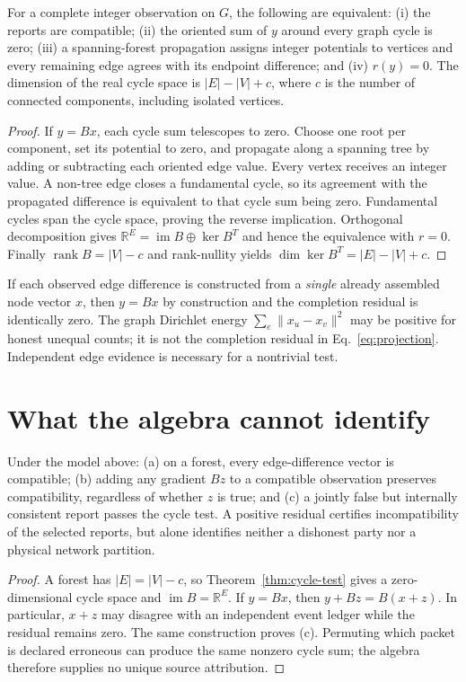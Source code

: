 \documentclass[11pt,a4paper]{article}
\begin{document}
\begin{theorem}\label{thm:cycle-test}
For a complete integer observation on $G$, the following are equivalent: (i) the reports are compatible; (ii) the oriented sum of $y$ around every graph cycle is zero; (iii) a spanning-forest propagation assigns integer potentials to vertices and every remaining edge agrees with its endpoint difference; and (iv) $r(y)=0$. The dimension of the real cycle space is $|E|-|V|+c$, where $c$ is the number of connected components, including isolated vertices.
\end{theorem}
\begin{proof}
If $y=Bx$, each cycle sum telescopes to zero. Choose one root per component, set its potential to zero, and propagate along a spanning tree by adding or subtracting each oriented edge value. Every vertex receives an integer value. A non-tree edge closes a fundamental cycle, so its agreement with the propagated difference is equivalent to that cycle sum being zero. Fundamental cycles span the cycle space, proving the reverse implication. Orthogonal decomposition gives $\mathbb R^E=\operatorname{im}B\oplus\ker B^T$ and hence the equivalence with $r=0$. Finally $\operatorname{rank}B=|V|-c$ and rank-nullity yields $\dim\ker B^T=|E|-|V|+c$.
\end{proof}

If each observed edge difference is constructed from a \emph{single} already assembled node vector $x$, then $y=Bx$ by construction and the completion residual is identically zero. The graph Dirichlet energy $\sum_e\|x_u-x_v\|^2$ may be positive for honest unequal counts; it is not the completion residual in Eq.~\ref{eq:projection}. Independent edge evidence is necessary for a nontrivial test.

\section{What the algebra cannot identify}\label{sec:limits}
\begin{theorem}\label{thm:compatibility-limits}
Under the model above: (a) on a forest, every edge-difference vector is compatible; (b) adding any gradient $Bz$ to a compatible observation preserves compatibility, regardless of whether $z$ is true; and (c) a jointly false but internally consistent report passes the cycle test. A positive residual certifies incompatibility of the selected reports, but alone identifies neither a dishonest party nor a physical network partition.
\end{theorem}
\begin{proof}
A forest has $|E|=|V|-c$, so Theorem~\ref{thm:cycle-test} gives a zero-dimensional cycle space and $\operatorname{im}B=\mathbb R^E$. If $y=Bx$, then $y+Bz=B(x+z)$. In particular, $x+z$ may disagree with an independent event ledger while the residual remains zero. The same construction proves (c). Permuting which packet is declared erroneous can produce the same nonzero cycle sum; the algebra therefore supplies no unique source attribution.
\end{proof}
\end{document}
